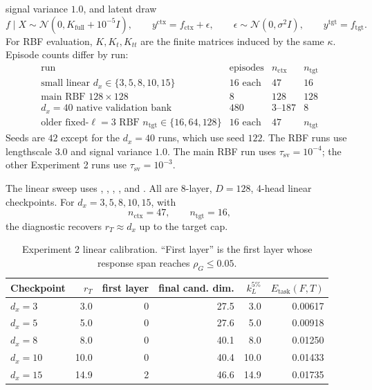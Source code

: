\documentclass[11pt]{article}
\begin{document}
signal variance \(1.0\), and latent draw
\[
f\mid X\sim\mathcal{N}(0,K_{\mathrm{full}}+10^{-5}I),
\qquad
y^{\mathrm{ctx}}=f_{\mathrm{ctx}}+\epsilon,
\qquad
\epsilon\sim\mathcal{N}(0,\sigma^2I),
\qquad
y^{\mathrm{tgt}}=f_{\mathrm{tgt}}.
\]
For RBF evaluation, \(K,K_t,K_{tt}\) are the finite matrices induced by the same \(\kappa\). Episode
counts differ by run:
\[
\begin{array}{lccc}
\text{run} & \text{episodes} & n_{\mathrm{ctx}} & n_{\mathrm{tgt}}\\
\hline
\text{small linear }d_x\in\{3,5,8,10,15\} & 16\text{ each} & 47 & 16\\
\text{main RBF }128\times128 & 8 & 128 & 128\\
d_x=40\text{ native validation bank} & 480 & 3\text{--}187 & 8\\
\text{older fixed-}\ell=3\text{ RBF }n_{\mathrm{tgt}}\in\{16,64,128\} & 16\text{ each} & 47 & n_{\mathrm{tgt}}
\end{array}
\]
Seeds are \(42\) except for the \(d_x=40\) runs, which use seed \(122\). The RBF runs use
lengthscale \(3.0\) and signal variance \(1.0\). The main RBF run uses
\(\tau_{\mathrm{sv}}=10^{-4}\); the other Experiment 2 runs use \(\tau_{\mathrm{sv}}=10^{-3}\).

The linear sweep uses
, , ,
, and . All are 8-layer, \(D=128\), 4-head
linear checkpoints. For \(d_x=3,5,8,10,15\), with
\[
n_{\mathrm{ctx}}=47,\qquad n_{\mathrm{tgt}}=16,
\]
the diagnostic recovers \(r_T\approx d_x\) up to the target cap.

\begin{table}[htbp]
\centering
\caption{Experiment 2 linear calibration. ``First layer'' is the first layer whose response span
reaches \(\rho_G\le0.05\).}
\scriptsize
\setlength{\tabcolsep}{4pt}
\renewcommand{\arraystretch}{0.9}
\begin{tabular}{lrrrrr}
\toprule
Checkpoint & \(r_T\) & first layer & final cand. dim. & \(k_L^{5\%}\) & \(E_{\mathrm{task}}(F,T)\)\\
\midrule
\(d_x=3\)  & 3.0  & 0 & 27.5 & 3.0  & 0.00617\\
\(d_x=5\)  & 5.0  & 0 & 27.6 & 5.0  & 0.00918\\
\(d_x=8\)  & 8.0  & 0 & 40.1 & 8.0  & 0.01250\\
\(d_x=10\) & 10.0 & 0 & 40.4 & 10.0 & 0.01433\\
\(d_x=15\) & 14.9 & 2 & 46.6 & 14.9 & 0.01735\\
\bottomrule
\end{tabular}
\renewcommand{\arraystretch}{1}
\end{table}
\end{document}
